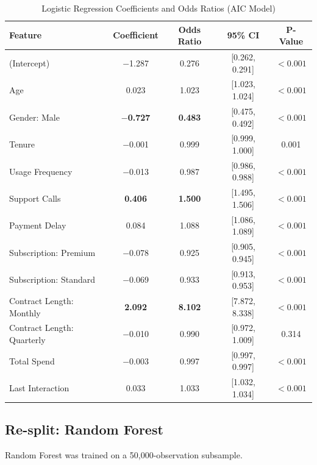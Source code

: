 \documentclass[12pt]{article}
\begin{document}
\begin{table}[H]
    \centering
    \caption{Logistic Regression Coefficients and Odds Ratios (AIC Model)}
    \label{tab:coefficients}
    \small
    \begin{tabular}{lcccc}
        \toprule
        \textbf{Feature} & \textbf{Coefficient} & \textbf{Odds Ratio} & \textbf{95\% CI} & \textbf{P-Value} \\
        \midrule
        (Intercept)               & $-$1.287 & 0.276 & [0.262, 0.291] & $<0.001$ \\
        Age                       &  0.023 & 1.023 & [1.023, 1.024] & $<0.001$ \\
        Gender: Male              & $-$\textbf{0.727} & \textbf{0.483} & [0.475, 0.492] & $<0.001$ \\
        Tenure                    & $-$0.001 & 0.999 & [0.999, 1.000] & 0.001 \\
        Usage Frequency           & $-$0.013 & 0.987 & [0.986, 0.988] & $<0.001$ \\
        Support Calls             &  \textbf{0.406} & \textbf{1.500} & [1.495, 1.506] & $<0.001$ \\
        Payment Delay             &  0.084 & 1.088 & [1.086, 1.089] & $<0.001$ \\
        Subscription: Premium     & $-$0.078 & 0.925 & [0.905, 0.945] & $<0.001$ \\
        Subscription: Standard    & $-$0.069 & 0.933 & [0.913, 0.953] & $<0.001$ \\
        Contract Length: Monthly  &  \textbf{2.092} & \textbf{8.102} & [7.872, 8.338] & $<0.001$ \\
        Contract Length: Quarterly & $-$0.010 & 0.990 & [0.972, 1.009] & 0.314 \\
        Total Spend               & $-$0.003 & 0.997 & [0.997, 0.997] & $<0.001$ \\
        Last Interaction          &  0.033 & 1.033 & [1.032, 1.034] & $<0.001$ \\
        \bottomrule
    \end{tabular}
\end{table}


\subsection{Re-split: Random Forest}

Random Forest was trained on a 50,000-observation subsample.
\end{document}
